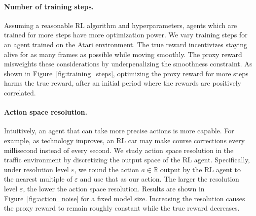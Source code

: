 \paragraph{Number of training steps.} Assuming a reasonable RL algorithm and hyperparameters, agents which are trained for more steps have more optimization power. %
%
We vary training steps for an agent trained on the Atari environment. The true reward incentivizes staying alive for as many frames as possible while moving smoothly. The proxy reward misweights these considerations by underpenalizing the smoothness constraint. As shown in Figure~\ref{fig:training_steps}, optimizing the proxy reward for more steps harms the true reward, after an initial period where the rewards are positively correlated.  %

\paragraph{Action space resolution.} Intuitively, an agent that can take more precise actions is more capable. %
For example, as technology improves, an RL car may make course corrections every millisecond instead of every second. We study action space resolution in the traffic environment by discretizing the output space of the RL agent. Specifically, under resolution level $\varepsilon$, we round the action $a \in \mathbb{R}$ output by the RL agent to the nearest multiple of $\varepsilon$ and use that as our action.  The larger the resolution level $\varepsilon$, the lower the action space resolution. Results are shown in Figure~\ref{fig:action_noise} for a fixed model size. Increasing the resolution causes the proxy reward to remain roughly constant while the true reward decreases. %

